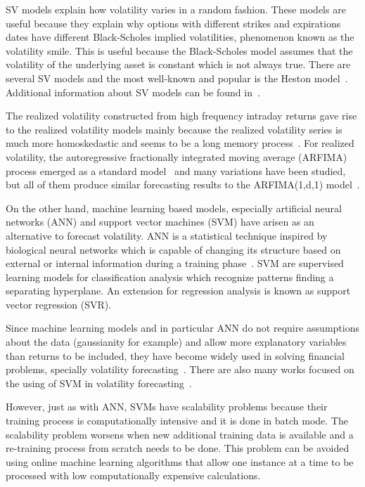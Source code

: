 SV models explain how volatility varies in a random fashion. These models are
useful because they explain why options with different strikes and expirations
dates have different Black-Scholes implied volatilities, phenomenon known as
the volatility smile. This is useful because the Black-Scholes model assumes
that the volatility of the underlying asset is constant which is not always
true. There are several SV models and the most well-known and popular is the
Heston model~\cite{heston1993}. Additional information about SV models can be
found in~\cite{shephard1995}. 

The realized volatility constructed from high frequency intraday returns gave
rise to the realized volatility models mainly because the realized volatility
series is much more homoskedastic and seems to be a long memory
process~\cite{andersonetal2003}. For realized volatility, the autoregressive
fractionally integrated moving average (ARFIMA) process emerged as a standard
model~\cite{chenetal2010} and many variations have been studied, but all of
them produce similar forecasting results to the ARFIMA(1,d,1)
model~\cite{koopmanetal2005}.  

On the other hand, machine learning based models, especially artificial neural
networks (ANN) and support vector machines (SVM) have arisen as an alternative
to forecast volatility. ANN is a statistical technique inspired by biological
neural networks which is capable of changing its structure based on external or
internal information during a training phase~\cite{sammut2011}. SVM are
supervised learning models for classification analysis which recognize patterns
finding a separating hyperplane. An extension for regression analysis is known
as support vector regression (SVR). 

Since machine learning models and in particular ANN do not require assumptions
about the data (gaussianity for example) and allow more explanatory variables
than returns to be included, they have become widely used in solving financial
problems, specially volatility
forecasting~\cite{hamidetal2004,donaldsonetal1997}. There are also many works
focused on the using of SVM in volatility
forecasting~\cite{shiyietal2008,shiyietal2010,gavrishchaka2006,vasilios2012}. 

However, just as with ANN, SVMs have scalability problems because their
training process is computationally intensive and it is done in batch mode. The
scalability problem worsens when new additional training data is available and
a re-training process from scratch needs to be done. This problem can be
avoided using online machine learning algorithms that allow one instance at a
time to be processed with low computationally expensive calculations.

